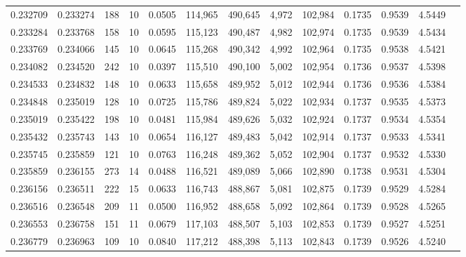 \begin{tabular}{rrrrrrrrrrrrr}
0.232709 & 0.233274 &   188 &  10 &                                     0.0505 & 114,965 & 490,645 &   4,972 & 102,984 & 0.1735 & 0.9539 & 4.5449 \\
0.233284 & 0.233768 &   158 &  10 &                                     0.0595 & 115,123 & 490,487 &   4,982 & 102,974 & 0.1735 & 0.9539 & 4.5434 \\
0.233769 & 0.234066 &   145 &  10 &                                     0.0645 & 115,268 & 490,342 &   4,992 & 102,964 & 0.1735 & 0.9538 & 4.5421 \\
0.234082 & 0.234520 &   242 &  10 &                                     0.0397 & 115,510 & 490,100 &   5,002 & 102,954 & 0.1736 & 0.9537 & 4.5398 \\
0.234533 & 0.234832 &   148 &  10 &                                     0.0633 & 115,658 & 489,952 &   5,012 & 102,944 & 0.1736 & 0.9536 & 4.5384 \\
0.234848 & 0.235019 &   128 &  10 &                                     0.0725 & 115,786 & 489,824 &   5,022 & 102,934 & 0.1737 & 0.9535 & 4.5373 \\
0.235019 & 0.235422 &   198 &  10 &                                     0.0481 & 115,984 & 489,626 &   5,032 & 102,924 & 0.1737 & 0.9534 & 4.5354 \\
0.235432 & 0.235743 &   143 &  10 &                                     0.0654 & 116,127 & 489,483 &   5,042 & 102,914 & 0.1737 & 0.9533 & 4.5341 \\
0.235745 & 0.235859 &   121 &  10 &                                     0.0763 & 116,248 & 489,362 &   5,052 & 102,904 & 0.1737 & 0.9532 & 4.5330 \\
0.235859 & 0.236155 &   273 &  14 &                                     0.0488 & 116,521 & 489,089 &   5,066 & 102,890 & 0.1738 & 0.9531 & 4.5304 \\
0.236156 & 0.236511 &   222 &  15 &                                     0.0633 & 116,743 & 488,867 &   5,081 & 102,875 & 0.1739 & 0.9529 & 4.5284 \\
0.236516 & 0.236548 &   209 &  11 &                                     0.0500 & 116,952 & 488,658 &   5,092 & 102,864 & 0.1739 & 0.9528 & 4.5265 \\
0.236553 & 0.236758 &   151 &  11 &                                     0.0679 & 117,103 & 488,507 &   5,103 & 102,853 & 0.1739 & 0.9527 & 4.5251 \\
0.236779 & 0.236963 &   109 &  10 &                                     0.0840 & 117,212 & 488,398 &   5,113 & 102,843 & 0.1739 & 0.9526 & 4.5240 \\

\end{tabular}
